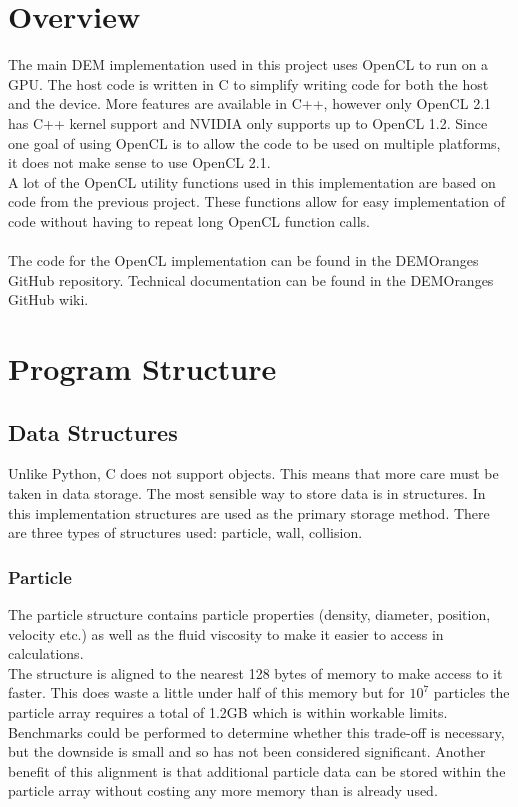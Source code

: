 \documentclass[a4paper,11pt,titlepage]{report}
\begin{document}
\section{Overview}
The main DEM implementation used in this project uses OpenCL to run on a GPU. The host code is written in C to simplify writing code for both the host and the device. More features are available in C++, however only OpenCL 2.1 has C++ kernel support and NVIDIA only supports up to OpenCL 1.2. Since one goal of using OpenCL is to allow the code to be used on multiple platforms, it does not make sense to use OpenCL 2.1.
\\A lot of the OpenCL utility functions used in this implementation are based on code from the previous project\cite{achow}. These functions allow for easy implementation of code without having to repeat long OpenCL function calls.
\\\\The code for the OpenCL implementation can be found in the DEMOranges GitHub repository\cite{DEMOranges}. Technical documentation can be found in the DEMOranges GitHub wiki\cite{DEMOrangesWiki}.
\section{Program Structure}
\subsection{Data Structures}
Unlike Python, C does not support objects. This means that more care must be taken in data storage. The most sensible way to store data is in structures. In this implementation structures are used as the primary storage method. There are three types of structures used: particle, wall, collision.
\subsubsection{Particle}
The particle structure contains particle properties (density, diameter, position, velocity etc.) as well as the fluid viscosity to make it easier to access in calculations.
\\The structure is aligned to the nearest 128 bytes of memory to make access to it faster. This does waste a little under half of this memory but for $10^7$ particles the particle array requires a total of 1.2GB which is within workable limits. Benchmarks could be performed to determine whether this trade-off is necessary, but the downside is small and so has not been considered significant. Another benefit of this alignment is that additional particle data can be stored within the particle array without costing any more memory than is already used.
\end{document}
